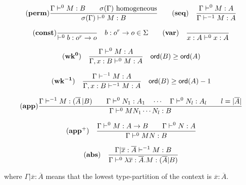 \begin{table}[htbp]
$$  \mathbf{(perm)} {
      { \Gamma \vdash^0 M:B \qquad \sigma(\Gamma)  } \hbox{ homogeneous}
    \over
      { \sigma(\Gamma) \vdash^0 M : B }
    }
\qquad
\mathbf{(seq)} \quad \frac{\displaystyle \Gamma \vdash^{0} M : A}{\Gamma \vdash^{-1} M : A}
$$

$$
 \mathbf{(const)}
    { \over { \vdash^0 b : o^r \rightarrow o}} \quad b : o^r \rightarrow o \in \Sigma
\qquad
 \mathbf{(var)} \quad  \frac{\displaystyle }{x : A\vdash^{0} x : A} $$

$$ \mathbf{(wk^{0})} \quad  \frac{\displaystyle \Gamma \vdash^{0} M : A}{\Gamma , x : B \vdash^{0} M : A} \quad {\sf ord}(B) \geq {\sf ord}(A) $$

$$ \mathbf{(wk^{-1})} \quad  \frac{\displaystyle \Gamma \vdash^{-1} M : A}{\Gamma , x : B \vdash^{-1} M : A} \quad {\sf ord}(B) \geq {\sf ord}(A) -1$$


$$ \mathbf{(app)}
    \frac{\displaystyle    \Gamma \vdash^{-1} M : (\overline{A} \, | B)
            \qquad
            \Gamma \vdash^0 N_1 : A_1 \quad \cdots \quad \Gamma \vdash^0 N_{l} : A_l \qquad l = |\overline{A}|
        }{
            \Gamma \vdash^0 M N_1 \cdots N_{l} : B
        }
$$

$$ \mathbf{(app^+)} \quad  \frac{\displaystyle \Gamma \vdash^0 M : A\rightarrow B
                                        \qquad \Gamma \vdash^{0} N : A
                                   }{\Gamma  \vdash^{0} M N : B}$$

$$ \mathbf{(abs)} \quad  \frac{\displaystyle \Gamma| \overline{x} : \overline{A} \vdash^{-1} M : B}{\Gamma  \vdash^{0} \lambda \overline{x} : \overline{A} . M : (\overline{A}|B)}$$


where $\Gamma| \overline{x} : \overline{A}$ means that the lowest type-partition of the context is
$\overline{x} : \overline{A}$.
\caption{Alternative rules for the homogeneous safe lambda calculus}
\label{tab:homosafelmd_rules_refined}
\end{table}
